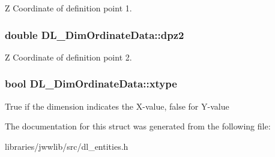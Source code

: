 Z Coordinate of definition point 1. \hypertarget{structDL__DimOrdinateData_a0608b8a7deab75151d45f39ff4e18066}{
\subsubsection[{dpz2}]{\setlength{\rightskip}{0pt plus 5cm}double D\-L\-\_\-\-Dim\-Ordinate\-Data\-::dpz2}}\label{structDL__DimOrdinateData_a0608b8a7deab75151d45f39ff4e18066}
Z Coordinate of definition point 2. \hypertarget{structDL__DimOrdinateData_afbc3cfb6eaf977407ab56698381e40b9}{
\subsubsection[{xtype}]{\setlength{\rightskip}{0pt plus 5cm}bool D\-L\-\_\-\-Dim\-Ordinate\-Data\-::xtype}}\label{structDL__DimOrdinateData_afbc3cfb6eaf977407ab56698381e40b9}
True if the dimension indicates the X-\/value, false for Y-\/value 

The documentation for this struct was generated from the following file\-:\begin{DoxyCompactItemize}
\item 
libraries/jwwlib/src/dl\-\_\-entities.\-h\end{DoxyCompactItemize}
